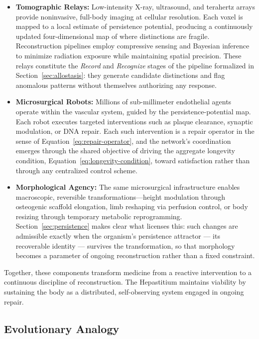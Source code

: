 \documentclass[12pt]{article}
\begin{document}
\begin{itemize}[leftmargin=*]
\item \textbf{Tomographic Relays:} Low-intensity X-ray, ultrasound, and terahertz arrays provide noninvasive, full-body imaging at cellular resolution. Each voxel is mapped to a local estimate of persistence potential, producing a continuously updated four-dimensional map of where distinctions are fragile. Reconstruction pipelines employ compressive sensing and Bayesian inference to minimize radiation exposure while maintaining spatial precision. These relays constitute the \emph{Record} and \emph{Recognize} stages of the pipeline formalized in Section~\ref{sec:allostasis}: they generate candidate distinctions and flag anomalous patterns without themselves authorizing any response.

\item \textbf{Microsurgical Robots:} Millions of sub-millimeter endothelial agents operate within the vascular system, guided by the persistence-potential map. Each robot executes targeted interventions such as plaque clearance, synaptic modulation, or DNA repair. Each such intervention is a repair operator in the sense of Equation~\eqref{eq:repair-operator}, and the network's coordination emerges through the shared objective of driving the aggregate longevity condition, Equation~\eqref{eq:longevity-condition}, toward satisfaction rather than through any centralized control scheme.

\item \textbf{Morphological Agency:} The same microsurgical infrastructure enables macroscopic, reversible transformations---height modulation through osteogenic scaffold elongation, limb reshaping via perfusion control, or body resizing through temporary metabolic reprogramming. Section~\ref{sec:persistence} makes clear what licenses this: such changes are admissible exactly when the organism's persistence attractor --- its recoverable identity --- survives the transformation, so that morphology becomes a parameter of ongoing reconstruction rather than a fixed constraint.
\end{itemize}

Together, these components transform medicine from a reactive intervention to a continuous discipline of reconstruction. The Hepastitium maintains viability by sustaining the body as a distributed, self-observing system engaged in ongoing repair.

\subsection{Evolutionary Analogy}
\end{document}
